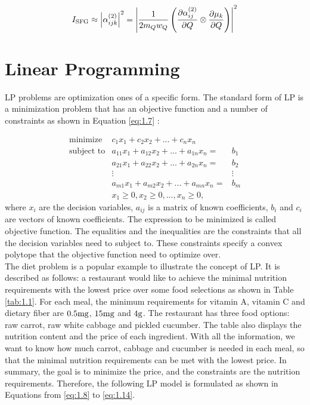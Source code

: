 \begin{equation} \label{eq:1.6}
I_{\rm SFG} \approx \left| \alpha^{(2)}_{ijk} \right|^{2}
= \left| \frac{1}{2m_{Q}w_{Q}} \left( \frac{\partial\alpha^{(2)}_{ij}}{\partial Q} \otimes \frac{\partial\mu_{k}}{\partial Q} \right) \right|^{2}
\end{equation}

\section{Linear Programming}
LP problems are optimization ones of a specific form. The standard form of LP is a minimization problem that has an objective function and a number of constraints as shown in Equation \ref{eq:1.7} \cite{UULP}:

\begin{eqnarray}  \label{eq:1.7}
 \text{minimize} & c_{1}x_{1} + c_{2}x_{2} + ... + c_{n} x_{n}  \nonumber \\
 \text{subject to} & a_{11} x_{1} + a_{12} x_{2}+ ... + a_{1n} x_{n} = & b_{1} \nonumber \\
& a_{21} x_{1} + a_{22} x_{2} + ... + a_{2n} x_{n} = & b_{2} \nonumber \\
&\vdots                                   &\vdots \nonumber \\
& a_{m1} x_{1} + a_{m2} x_{2} + ... + a_{mn} x_{n} = & b_{m} \nonumber \\
& x_{1} \geq 0, x_{2} \geq 0, ... ,x_{n} \geq 0, 
\end{eqnarray} 
where $x_{i}$ are the decision variables, $a_{ij}$ is a matrix of known coefficients, $b_{i}$ and $c_{i}$ are vectors of known coefficients. The expression to be minimized is called objective function. The equalities and the inequalities are the constraints that all the decision variables need to subject to. These constraints specify a convex polytope that the objective function need to optimize over. \\ 

The diet problem is a popular example to illustrate the concept of LP. It is described as follows: a restaurant would like to achieve the minimal nutrition requirements with the lowest price over some food selections as shown in Table \ref{tab:1.1}. For each meal, the minimum requirements for vitamin A, vitamin C and dietary fiber are $0.5 \rm mg$, $15 \rm mg$ and $4 \rm g$. The restaurant has three food options: raw carrot, raw white cabbage and pickled cucumber. The table also displays the nutrition content and the price of each ingredient. With all the information, we want to know how much carrot, cabbage and cucumber is needed in each meal, so that the minimal nutrition requirements can be met with the lowest price. In summary, the goal is to minimize the price, and the constraints are the nutrition requirements. Therefore, the following LP model is formulated as shown in Equations from \ref{eq:1.8} to \ref{eq:1.14}.

